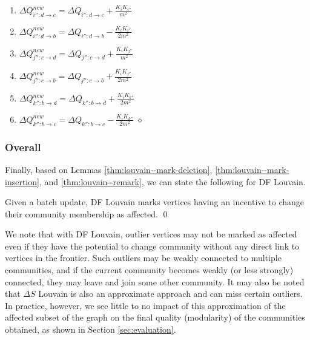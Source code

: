\begin{enumerate}[start=23]
  \item $\Delta Q_{i'':d \rightarrow c}^{new} = \Delta Q_{i'':d \rightarrow c} + \frac{K_iK_{i''}}{m^2}$
  \item $\Delta Q_{i'':d \rightarrow b}^{new} = \Delta Q_{i'':d \rightarrow b} - \frac{K_iK_{i''}}{2m^2}$
  \item $\Delta Q_{j'':c \rightarrow d}^{new} = \Delta Q_{j'':c \rightarrow d} + \frac{K_iK_{j''}}{m^2}$
  \item $\Delta Q_{j'':c \rightarrow b}^{new} = \Delta Q_{j'':c \rightarrow b} + \frac{K_iK_{j''}}{2m^2}$
  \item $\Delta Q_{k'':b \rightarrow d}^{new} = \Delta Q_{k'':b \rightarrow d} + \frac{K_iK_{k''}}{2m^2}$
  \item $\Delta Q_{k'':b \rightarrow c}^{new} = \Delta Q_{k'':b \rightarrow c} - \frac{K_iK_{k''}}{2m^2}$ \hfill $\diamond$
\end{enumerate}




\subsubsection{Overall}

Finally, based on Lemmas \ref{thm:louvain--mark-deletion}, \ref{thm:louvain--mark-insertion}, and \ref{thm:louvain--remark}, we can state the following for DF Louvain.

\begin{theorem}
\label{thm:louvain}
Given a batch update, DF Louvain marks vertices having an incentive to change their community membership as affected. \qed
\end{theorem}

We note that with DF Louvain, outlier vertices may not be marked as affected even if they have the potential to change community without any direct link to vertices in the frontier. Such outliers may be weakly connected to multiple communities, and if the current community becomes weakly (or less strongly) connected, they may leave and join some other community. It may also be noted that $\Delta S$ Louvain is also an approximate approach and can miss certain outliers. In practice, however, we see little to no impact of this approximation of the affected subset of the graph on the final quality (modularity) of the communities obtained, as shown in Section \ref{sec:evaluation}.
